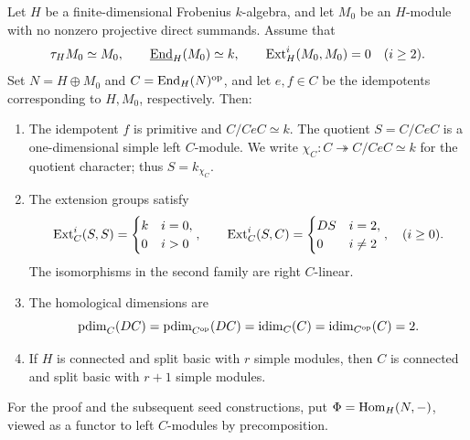 \documentclass[11pt]{article}
\begin{document}
\begin{Prop} \label{general:seed}
Let $H$ be a finite-dimensional Frobenius $k$-algebra, and let
$M_0$ be an $H$-module with no nonzero projective direct summands.
Assume that
\begin{equation*}
 \tau_HM_0\simeq M_0,\qquad \underline{{\rm End}}_H(M_0)\simeq k,\qquad
 {\rm Ext}_H^i(M_0,M_0)=0\quad(i\ge2).
\end{equation*}
Set $N=H\oplus M_0$ and $C={\rm End}_H(N)^{\mathrm{op}}$, and let
$e,f\in C$ be the idempotents corresponding to $H,M_0$,
respectively. Then:
\begin{enumerate}
\item\label{general:seed-simple}
The idempotent $f$ is primitive and $C/CeC\simeq k$. The quotient $S=C/CeC$ is a one-dimensional
simple left $C$-module. We write
$\chi_C:C\twoheadrightarrow C/CeC\simeq k$ for the quotient
character; thus $S=k_{\chi_C}$.

\item\label{general:seed-homology}
The extension groups satisfy
\begin{equation*}
 {\rm Ext}_C^i(S,S)=
 \begin{cases}k&i=0,\\0&i>0\end{cases},
 \qquad
 {\rm Ext}_C^i(S,C)=
 \begin{cases}DS&i=2,\\0&i\ne2\end{cases},
 \quad(i\ge0).
\end{equation*}
The isomorphisms in the second family are right $C$-linear.

\item\label{general:seed-dimension}
The homological dimensions are
\begin{equation*}
 {\rm pdim}_C(DC)={\rm pdim}_{C^{\mathrm{op}}}(DC)
 ={\rm idim}_C(C)={\rm idim}_{C^{\mathrm{op}}}(C)=2.
\end{equation*}

\item\label{general:seed-basic}
If $H$ is connected and split basic with $r$ simple modules, then
$C$ is connected and split basic with $r+1$ simple modules.

\end{enumerate}
\end{Prop}

For the proof and the subsequent seed constructions, put
$\Phi={\rm Hom}_H(N,-)$, viewed as a functor to left $C$-modules
by precomposition.
\end{document}
